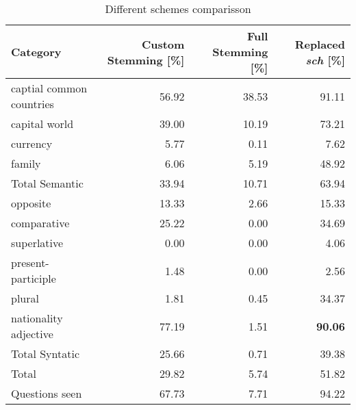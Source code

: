 \begin{table}[h]
\centering
\small
\caption{Different schemes comparisson } 
\label{tab:stemming_comparisson}
\small
\begin{tabular}{lrrr}
 Category                  &  Custom Stemming [\%]  &  Full Stemming [\%]  &  Replaced \emph{sch} [\%]  \\
\hline
 captial common countries  &                 56.92  &               38.53  &                     91.11  \\
 capital world             &                 39.00  &               10.19  &                     73.21  \\
 currency                  &                  5.77  &                0.11  &                      7.62  \\
 family                    &                  6.06  &                5.19  &                     48.92  \\
\hline
 Total Semantic            &                 33.94  &               10.71  &                     63.94  \\
\hline
 opposite                  &                 13.33  &                2.66  &                     15.33  \\
 comparative               &                 25.22  &                0.00  &                     34.69  \\
 superlative               &                  0.00  &                0.00  &                      4.06  \\
 present-participle        &                  1.48  &                0.00  &                      2.56  \\
 plural                    &                  1.81  &                0.45  &                     34.37  \\
 nationality adjective     &                 77.19  &                1.51  &            \textbf{90.06}  \\
\hline
 Total Syntatic            &                 25.66  &                0.71  &                     39.38  \\
\hline
 Total                     &                 29.82  &                5.74  &                     51.82  \\
\hline
 Questions seen            &                 67.73  &                7.71  &                     94.22  \\
\hline
\end{tabular}
\end{table}







